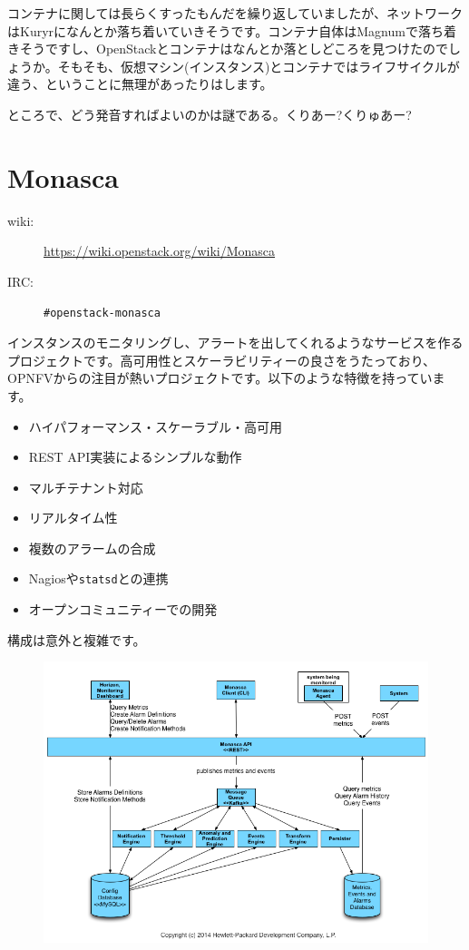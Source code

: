 コンテナに関しては長らくすったもんだを繰り返していましたが、ネットワークはKuryrになんとか落ち着いていきそうです。コンテナ自体はMagnumで落ち着きそうですし、OpenStackとコンテナはなんとか落としどころを見つけたのでしょうか。そもそも、仮想マシン(インスタンス)とコンテナではライフサイクルが違う、ということに無理があったりはします。

ところで、どう発音すればよいのかは謎である。くりあー?くりゅあー?

\section{Monasca}

\begin{description}
	\item[wiki:] \url{https://wiki.openstack.org/wiki/Monasca}
	\item[IRC:] \verb|#openstack-monasca|
\end{description}

インスタンスのモニタリングし、アラートを出してくれるようなサービスを作るプロジェクトです。高可用性とスケーラビリティーの良さをうたっており、OPNFVからの注目が熱いプロジェクトです。以下のような特徴を持っています。

\begin{itemize}
	\item ハイパフォーマンス・スケーラブル・高可用
	\item REST API実装によるシンプルな動作
	\item マルチテナント対応
	\item リアルタイム性
	\item 複数のアラームの合成
	\item Nagiosや\verb|statsd|との連携
	\item オープンコミュニティーでの開発
\end{itemize}

構成は意外と複雑です。

\begin{figure}
	\includegraphics[width=\textwidth]{img/Monasca-arch-component-diagram.png}
\end{figure}

